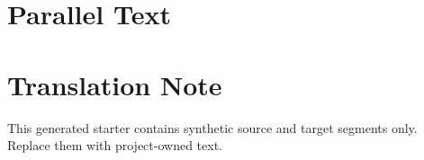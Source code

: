 \documentclass[10pt,twoside,openany]{book}
\begin{document}
\PSEBeginFrontMatter
\PSETitlePage
\PSEPublicationPage
\tableofcontents
\clearpage
\PSEBeginBody
\chapter{Parallel Text}

\PSEBeginBackMatter
\chapter*{Translation Note}
This generated starter contains synthetic source and target segments only. Replace them with project-owned text.
\end{document}
